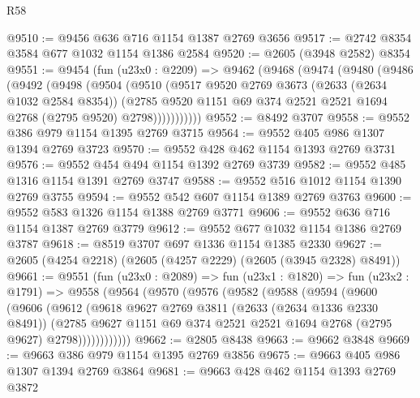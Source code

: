 \begin{lexlean}{R58}
\begin{coremodule}
@9510 := @9456 @636 @716 @1154 @1387 @2769 @3656
@9517 := @2742 @8354 @3584 @677 @1032 @1154 @1386 @2584
@9520 := @2605 (@3948 @2582) @8354
@9551 := @9454
    (fun (u23x0 : @2209) =>
    @9462
      (@9468
        (@9474
          (@9480
            (@9486
              (@9492
                (@9498
                  (@9504
                    (@9510
                      (@9517
                        @9520
                        @2769
                        @3673
                        (@2633 (@2634 @1032 @2584 @8354))
                        (@2785
                          @9520
                          @1151
                          @69
                          @374
                          @2521
                          @2521
                          @1694
                          @2768
                          (@2795 @9520)
                          @2798)))))))))))
@9552 := @8492 @3707
@9558 := @9552 @386 @979 @1154 @1395 @2769 @3715
@9564 := @9552 @405 @986 @1307 @1394 @2769 @3723
@9570 := @9552 @428 @462 @1154 @1393 @2769 @3731
@9576 := @9552 @454 @494 @1154 @1392 @2769 @3739
@9582 := @9552 @485 @1316 @1154 @1391 @2769 @3747
@9588 := @9552 @516 @1012 @1154 @1390 @2769 @3755
@9594 := @9552 @542 @607 @1154 @1389 @2769 @3763
@9600 := @9552 @583 @1326 @1154 @1388 @2769 @3771
@9606 := @9552 @636 @716 @1154 @1387 @2769 @3779
@9612 := @9552 @677 @1032 @1154 @1386 @2769 @3787
@9618 := @8519 @3707 @697 @1336 @1154 @1385 @2330
@9627 := @2605 (@4254 @2218) (@2605 (@4257 @2229) (@2605 (@3945 @2328) @8491))
@9661 := @9551
    (fun (u23x0 : @2089) =>
    fun (u23x1 : @1820) =>
    fun (u23x2 : @1791) =>
    @9558
      (@9564
        (@9570
          (@9576
            (@9582
              (@9588
                (@9594
                  (@9600
                    (@9606
                      (@9612
                        (@9618
                          @9627
                          @2769
                          @3811
                          (@2633 (@2634 @1336 @2330 @8491))
                          (@2785
                            @9627
                            @1151
                            @69
                            @374
                            @2521
                            @2521
                            @1694
                            @2768
                            (@2795 @9627)
                            @2798))))))))))))
@9662 := @2805 @8438
@9663 := @9662 @3848
@9669 := @9663 @386 @979 @1154 @1395 @2769 @3856
@9675 := @9663 @405 @986 @1307 @1394 @2769 @3864
@9681 := @9663 @428 @462 @1154 @1393 @2769 @3872

\end{coremodule}
\end{lexlean}
